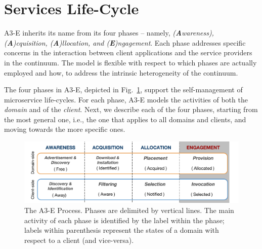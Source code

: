 \section{Services Life-Cycle}\label{sec:A3-E}

A3-E inherits its name from its four phases -- namely, \textit{(\textbf{A}wareness), (\textbf{A})cquisition, (\textbf{A})llocation, and (\textbf{E})ngagement}. Each phase addresses specific concerns in the interaction between client applications and the service providers in the continuum. The model is flexible with respect to which phases are actually employed and how, to address the intrinsic heterogeneity of the continuum. 

The four phases in A3-E, depicted in Fig.~\ref{fig:A3-E-process}, support the self-management of microservice life-cycles. For each phase, A3-E models the activities of both the \textit{domain} and of the \textit{client}. 
Next, we describe each of the four phases, starting from the most general one, i.e., the one that applies to all domains and clients, and moving towards the more specific ones.

\begin{figure}[tbp]
	\includegraphics[width=1\textwidth]{figs/A3-E-process}
	\caption{The A3-E Process. Phases are delimited by vertical lines. The main activity of each phase is identified by the label within the phase; labels within parenthesis represent the states of a domain with respect to a client (and vice-versa).}
	\label{fig:A3-E-process}
\end{figure}



